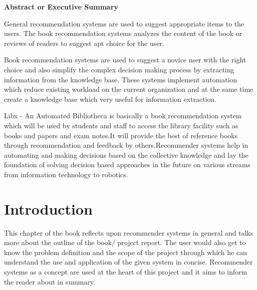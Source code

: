\documentclass[a4paper,12pt]{report}
\begin{document}
\pagebreak



  \vspace*{0.25cm}
  {\centering
  {\large\textbf{Abstract or Executive Summary}}\\
\par\justify
General recommendation systems are used to suggest appropriate items to the users. The book recommendation systems analyzes the content of the book or reviews of readers to suggest apt choice for the user.
\par\justify
Book recommendation systems are used to suggest a novice user with the right choice and also simplify the complex decision making process by extracting information from the knowledge base. These systems implement automation which reduce existing workload on the current organization and at the same time create a knowledge base which very useful for information extraction.
\par\justify
Libx - An Automated Bibliotheca is basically a book recommendation system which will be used by students and staff to access the library facility such as books and papers and exam notes.It will provide the best of reference books through recommendation and feedback by others.Recommender systems help in automating and making decisions based on the collective knowledge and lay the foundation of solving decision based approaches in the future on various streams from information technology to robotics.
  }


\pagebreak

\tableofcontents
{}

\listoffigures

\listoftables



\chapter{Introduction}

\par This chapter of the book reflects upon recommender systems in general and talks more about the outline of the book/ project report. The user would also get to know the problem definition and the scope of the project through which he can understand the use and application of the given system in concise. Recommender systems as a concept are used at the heart of this project and it aims to inform the reader about in summary. \\
\end{document}
